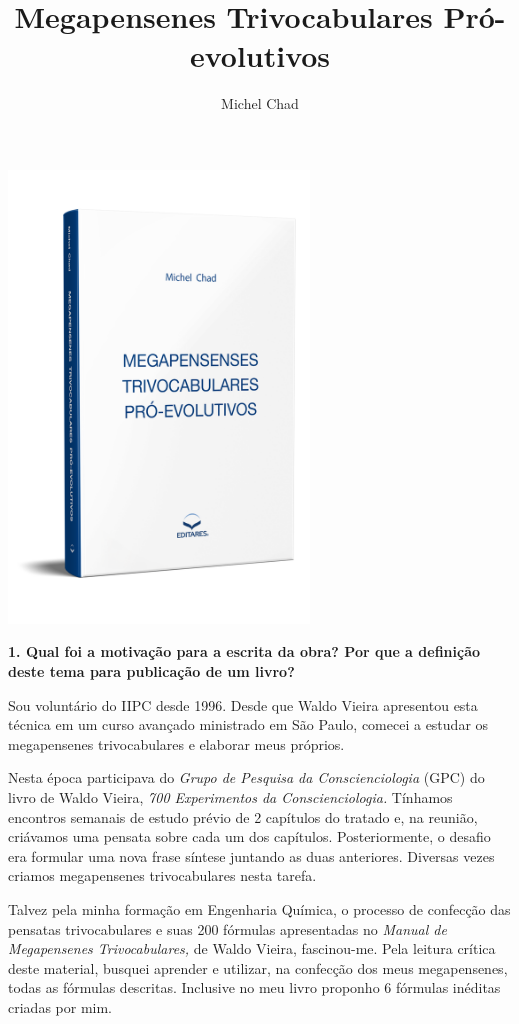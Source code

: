 \documentclass{gescons}
\author{Michel Chad}
\title{Megapensenes Trivocabulares Pró-evolutivos}
\begin{document}
    \makeentrevistatitle

    \begin{multicols}{2}



\begin{center}
    \includegraphics[width=8cm]{articles/entrevista/mockups/Michel-Chad.png}
\end{center}

\textbf{1.       Qual foi a motivação para a escrita da obra? Por que a definição deste tema para publicação de um livro?}

Sou voluntário do IIPC desde 1996. Desde que Waldo Vieira apresentou esta técnica em um curso avançado ministrado em São Paulo, comecei a estudar os megapensenes trivocabulares e elaborar meus próprios. 

Nesta época participava do \textit{Grupo de Pesquisa da Conscienciologia} (GPC) do livro de Waldo Vieira,  \textit{700 Experimentos da Conscienciologia.} Tínhamos encontros semanais de estudo prévio de 2 capítulos do tratado e, na reunião, criávamos uma pensata sobre cada um dos capítulos. Posteriormente, o desafio era formular uma nova frase síntese juntando as duas anteriores. Diversas vezes criamos megapensenes trivocabulares nesta tarefa. 

Talvez pela minha formação em Engenharia Química, o processo de confecção das pensatas trivocabulares e suas 200 fórmulas apresentadas no
\textit{Manual de Megapensenes Trivocabulares,} de Waldo Vieira,  fascinou-me. Pela leitura crítica deste material, busquei aprender e utilizar, na confecção dos meus megapensenes, todas as fórmulas descritas. Inclusive no meu livro proponho 6 fórmulas inéditas criadas por mim.


\end{multicols}
\end{document}
